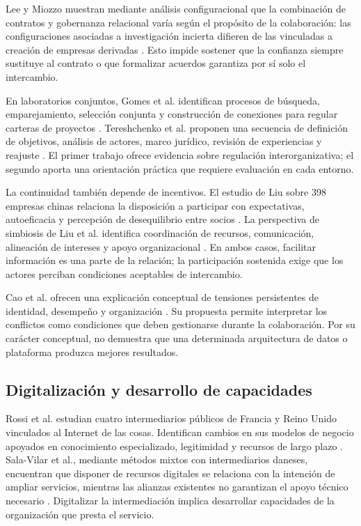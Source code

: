 \documentclass[12pt,twocolumn]{article}
\begin{document}
Lee y Miozzo muestran mediante análisis configuracional que la combinación de contratos y gobernanza relacional varía según el propósito de la colaboración: las configuraciones asociadas a investigación incierta difieren de las vinculadas a creación de empresas derivadas \cite{lee2024}. Esto impide sostener que la confianza siempre sustituye al contrato o que formalizar acuerdos garantiza por sí solo el intercambio.

En laboratorios conjuntos, Gomes et al. identifican procesos de búsqueda, emparejamiento, selección conjunta y construcción de conexiones para regular carteras de proyectos \cite{gomes2023}. Tereshchenko et al. proponen una secuencia de definición de objetivos, análisis de actores, marco jurídico, revisión de experiencias y reajuste \cite{tereshchenko2024}. El primer trabajo ofrece evidencia sobre regulación interorganizativa; el segundo aporta una orientación práctica que requiere evaluación en cada entorno.

La continuidad también depende de incentivos. El estudio de Liu sobre 398 empresas chinas relaciona la disposición a participar con expectativas, autoeficacia y percepción de desequilibrio entre socios \cite{liuhumanresources2025}. La perspectiva de simbiosis de Liu et al. identifica coordinación de recursos, comunicación, alineación de intereses y apoyo organizacional \cite{liusymbiosis2025}. En ambos casos, facilitar información es una parte de la relación; la participación sostenida exige que los actores perciban condiciones aceptables de intercambio.

Cao et al. ofrecen una explicación conceptual de tensiones persistentes de identidad, desempeño y organización \cite{selinacao2026}. Su propuesta permite interpretar los conflictos como condiciones que deben gestionarse durante la colaboración. Por su carácter conceptual, no demuestra que una determinada arquitectura de datos o plataforma produzca mejores resultados.

\subsection{Digitalización y desarrollo de capacidades}
Rossi et al. estudian cuatro intermediarios públicos de Francia y Reino Unido vinculados al Internet de las cosas. Identifican cambios en sus modelos de negocio apoyados en conocimiento especializado, legitimidad y recursos de largo plazo \cite{rossi2022}. Sala-Vilar et al., mediante métodos mixtos con intermediarios daneses, encuentran que disponer de recursos digitales se relaciona con la intención de ampliar servicios, mientras las alianzas existentes no garantizan el apoyo técnico necesario \cite{salavilar2024}. Digitalizar la intermediación implica desarrollar capacidades de la organización que presta el servicio.
\end{document}

